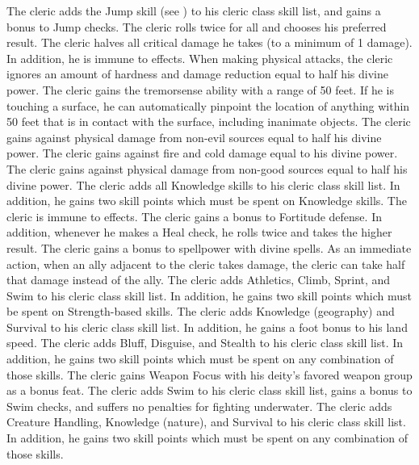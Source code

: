 The cleric adds the Jump skill (see ) to his cleric class skill list, and gains a  bonus to Jump checks.
The cleric rolls twice for all  and chooses his preferred result.
The cleric halves all critical damage he takes (to a minimum of 1 damage).
In addition, he is immune to  effects.
When making physical attacks, the cleric ignores an amount of hardness and damage reduction equal to half his divine power.
The cleric gains the tremorsense ability with a range of 50 feet.
If he is touching a surface, he can automatically pinpoint the location of anything within 50 feet that is in contact with the surface, including inanimate objects.
The cleric gains  against physical damage from non-evil sources equal to half his divine power.
The cleric gains  against fire and cold damage equal to his divine power.
The cleric gains  against physical damage from non-good sources equal to half his divine power.
The cleric adds all Knowledge skills to his cleric class skill list.
In addition, he gains two skill points which must be spent on Knowledge skills.
The cleric is immune to  effects.
The cleric gains a  bonus to Fortitude defense.
In addition, whenever he makes a Heal check, he rolls twice and takes the higher result.
The cleric gains a  bonus to spellpower with divine spells.
As an immediate action, when an ally adjacent to the cleric takes damage, the cleric can take half that damage instead of the ally.
The cleric adds Athletics, Climb, Sprint, and Swim to his cleric class skill list.
In addition, he gains two skill points which must be spent on Strength-based skills.
The cleric adds Knowledge (geography) and Survival to his cleric class skill list.
In addition, he gains a  foot bonus to his land speed.
The cleric adds Bluff, Disguise, and Stealth to his cleric class skill list.
In addition, he gains two skill points which must be spent on any combination of those skills.
The cleric gains Weapon Focus with his deity's favored weapon group as a bonus feat.
The cleric adds Swim to his cleric class skill list, gains a  bonus to Swim checks, and suffers no penalties for fighting underwater.
The cleric adds Creature Handling, Knowledge (nature), and Survival to his cleric class skill list.
In addition, he gains two skill points which must be spent on any combination of those skills.

